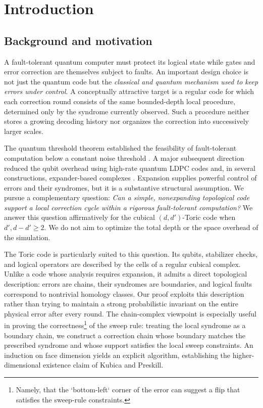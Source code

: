 \section{Introduction}

\subsection{Background and motivation}

A fault-tolerant quantum computer must protect its logical state while gates and error correction are themselves subject to faults. An important design choice is not just the quantum code but the \emph{classical and quantum mechanism used to keep errors under control}. A conceptually attractive target is a regular code for which each correction round consists of the same bounded-depth local procedure, determined only by the syndrome currently observed. Such a procedure neither stores a growing decoding history nor organizes the correction into successively larger scales.

The quantum threshold theorem established the feasibility of fault-tolerant computation below a constant noise threshold \cite{aharonov1999faulttolerant,Ninequ}. A major subsequent direction reduced the qubit overhead using high-rate quantum LDPC codes and, in several constructions, expander-based complexes \cite{gottesman2014faulttolerant,grospellier:tel-03364419,Fawzi_2018,nguyen2025quantumfaulttoleranceconstantspace}. Expansion supplies powerful control of errors and their syndromes, but it is a substantive structural assumption. We pursue a complementary question: \emph{Can a simple, nonexpanding topological code support a local correction cycle within a rigorous fault-tolerant computation?} We answer this question affirmatively for the cubical $(d,d')$-Toric code when $d',d-d'\geq 2$. We do not aim to optimize the total depth or the space overhead of the simulation.

The Toric code is particularly suited to this question. Its qubits, stabilizer checks, and logical operators are described by the cells of a regular cubical complex. Unlike a code whose analysis requires expansion, it admits a direct topological description: errors are chains, their syndromes are boundaries, and logical faults correspond to nontrivial homology classes. Our proof exploits this description rather than trying to maintain a strong probabilistic invariant on the entire physical error after every round. The chain-complex viewpoint is especially useful in proving the correctness\footnote{Namely, that the `bottom-left` corner of the error can suggest a flip that satisfies the sweep-rule constraints.} of the sweep rule: treating the local syndrome as a boundary chain, we construct a correction chain whose boundary matches the prescribed syndrome and whose support satisfies the local sweep constraints. An induction on face dimension yields an explicit algorithm, establishing the higher-dimensional existence claim of Kubica and Preskill.

